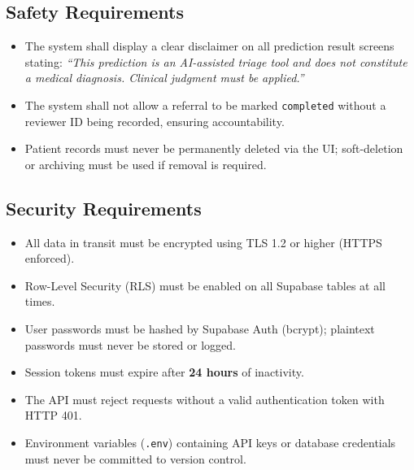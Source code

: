 \documentclass[12pt,a4paper]{article}
\begin{document}
\subsection{Safety Requirements}
\begin{itemize}
    \item The system shall display a clear disclaimer on all prediction result screens stating: \textit{``This prediction is an AI-assisted triage tool and does not constitute a medical diagnosis. Clinical judgment must be applied.''}
    \item The system shall not allow a referral to be marked \texttt{completed} without a reviewer ID being recorded, ensuring accountability.
    \item Patient records must never be permanently deleted via the UI; soft-deletion or archiving must be used if removal is required.
\end{itemize}

\subsection{Security Requirements}
\begin{itemize}
    \item All data in transit must be encrypted using TLS 1.2 or higher (HTTPS enforced).
    \item Row-Level Security (RLS) must be enabled on all Supabase tables at all times.
    \item User passwords must be hashed by Supabase Auth (bcrypt); plaintext passwords must never be stored or logged.
    \item Session tokens must expire after \textbf{24 hours} of inactivity.
    \item The API must reject requests without a valid authentication token with HTTP 401.
    \item Environment variables (\texttt{.env}) containing API keys or database credentials must never be committed to version control.
\end{itemize}
\end{document}
